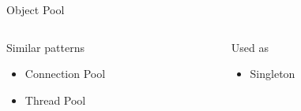 \documentclass{beamer}
\begin{document}
\begin{frame}{Object Pool}
  \pause

  \begin{columns}
    \begin{column}{.47\textwidth}
      \begin{block}{Similar patterns}
        \begin{itemize}
          \item Connection Pool
          \item Thread Pool
        \end{itemize}
      \end{block}
    \end{column}

    \begin{column}{.47\textwidth}
      \begin{block}{Used as}
        \begin{itemize}
          \item Singleton
        \end{itemize}
      \end{block}
    \end{column}
  \end{columns}

\end{frame}
\end{document}
